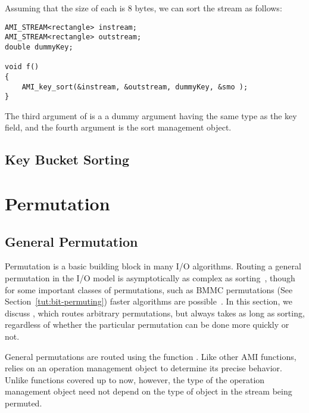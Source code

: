 Assuming that the size of each  is 8 bytes,
we can sort the stream as follows:
 
\begin{verbatim}
AMI_STREAM<rectangle> instream;
AMI_STREAM<rectangle> outstream;
double dummyKey;

void f()
{
    AMI_key_sort(&instream, &outstream, dummyKey, &smo );
}
\end{verbatim}

The third argument of  is a a
dummy argument having the same type as the key field, and
the fourth argument is the sort management
object.




\subsection{Key Bucket Sorting}


\tobewritten


\section{Permutation}

\subsection{General Permutation}

Permutation is a basic building block in many I/O
algorithms. Routing a general permutation in the I/O model
is asymptotically as complex as
sorting~\cite{aggarwal:input}, though for some important
classes of permutations, such as BMMC permutations (See
Section~\ref{tut:bit-permuting}) faster algorithms are
possible~\cite{cormen}. In this section, we discuss
, which routes arbitrary
permutations, but always takes as long as sorting,
regardless of whether the particular permutation can be done
more quickly or not.

General permutations are routed using the function
.  Like other AMI functions,
 relies on an operation management
object to determine its precise
behavior.  Unlike functions covered up to now, however, the type of
the operation management object
need not depend on the type of object in the stream being permuted.


